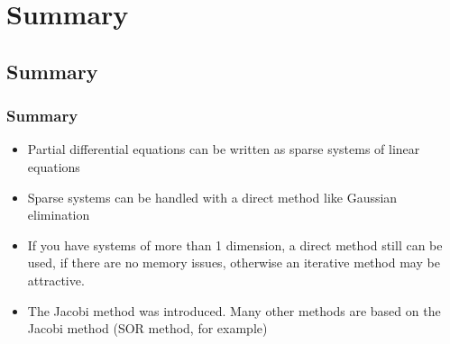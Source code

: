 \documentclass[11pt,table,final,xcolor={usenames,dvipsnames,table}]{beamer}
\begin{document}
\section{Summary}
\subsection*{Summary}
\begin{frame}[fragile]
  \frametitle{Summary}
  \begin{itemize}
   \item Partial differential equations can be written as sparse systems of linear equations
   \item Sparse systems can be handled with a direct method like Gaussian elimination
    \item If you have systems of more than 1 dimension, a direct method still can be used, if there are no memory issues, otherwise an iterative method may be attractive.
    \item The Jacobi method was introduced. Many other methods are based on the Jacobi method (SOR method, for example)
  \end{itemize}
\end{frame}
\end{document}
